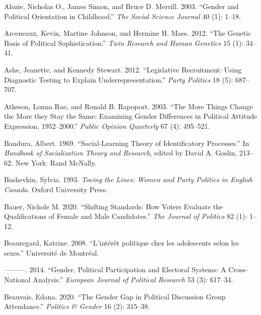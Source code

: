 \documentclass[
  letterpaper,
  DIV=11,
  numbers=noendperiod]{scrreprt}
\newlength{\cslhangindent}
\newlength{\cslentryspacingunit} %
\newenvironment{CSLReferences}[2] %
 {%
  \setlength{\parindent}{0pt}
  \ifodd #1
  \let\oldpar\par
  \def\par{\hangindent=\cslhangindent\oldpar}
  \fi
  \setlength{\parskip}{#2\cslentryspacingunit}
 }%
 {}
\begin{document}
\hypertarget{refs-1}{}
\begin{CSLReferences}{1}{0}
\leavevmode{}%
Alozie, Nicholas O., James Simon, and Bruce D. Merrill. 2003. {``{Gender
and Political Orientation in Childhood}.''} \emph{The Social Science
Journal} 40 (1): 1--18.

\leavevmode{}%
Arceneaux, Kevin, Martine Johnson, and Hermine H. Maes. 2012. {``{The
Genetic Basis of Political Sophistication}.''} \emph{Twin Research and
Human Genetics} 15 (1): 34--41.

\leavevmode{}%
Ashe, Jeanette, and Kennedy Stewart. 2012. {``{Legislative Recruitment:
Using Diagnostic Testing to Explain Underrepresentation}.''} \emph{Party
Politics} 18 (5): 687--707.

\leavevmode{}%
Atkeson, Lonna Rae, and Ronald B. Rapoport. 2003. {``{The More Things
Change the More they Stay the Same: Examining Gender Differences in
Political Attitude Expression, 1952--2000}.''} \emph{Public Opinion
Quarterly} 67 (4): 495--521.

\leavevmode{}%
Bandura, Albert. 1969. {``{Social-Learning Theory of Identificatory
Processes}.''} In \emph{{Handbook of Socialization Theory and
Research}}, edited by David A. Goslin, 213--62. New York: Rand McNally.

\leavevmode{}%
Bashevkin, Sylvia. 1993. \emph{{Toeing the Lines: Women and Party
Politics in English Canada}}. Oxford University Press.

\leavevmode{}%
Bauer, Nichole M. 2020. {``{Shifting Standards: How Voters Evaluate the
Qualifications of Female and Male Candidates}.''} \emph{The Journal of
Politics} 82 (1): 1--12.

\leavevmode{}%
Beauregard, Katrine. 2008. {``{L'intérêt politique chez les adolescents
selon les sexes}.''} Université de Montréal.

\leavevmode{}%
---------. 2014. {``{Gender, Political Participation and Electoral
Systems: A Cross-National Analysis}.''} \emph{European Journal of
Political Research} 53 (3): 617--34.

\leavevmode{}%
Beauvais, Edana. 2020. {``{The Gender Gap in Political Discussion Group
Attendance}.''} \emph{Politics \& Gender} 16 (2): 315--38.


\end{CSLReferences}
\end{document}
